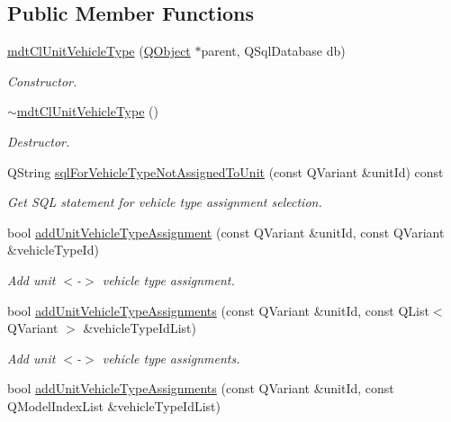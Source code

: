 \subsection*{Public Member Functions}
\begin{DoxyCompactItemize}
\item 
\hyperlink{classmdt_cl_unit_vehicle_type_a887c0df770b0943494c7852f593c795f}{mdt\-Cl\-Unit\-Vehicle\-Type} (\hyperlink{class_q_object}{Q\-Object} $\ast$parent, Q\-Sql\-Database db)
\begin{DoxyCompactList}\small\item\em Constructor. \end{DoxyCompactList}\item 
\hyperlink{classmdt_cl_unit_vehicle_type_a80006aaf243aa3b74d8a5f0fcefbb1fa}{$\sim$mdt\-Cl\-Unit\-Vehicle\-Type} ()
\begin{DoxyCompactList}\small\item\em Destructor. \end{DoxyCompactList}\item 
Q\-String \hyperlink{classmdt_cl_unit_vehicle_type_a94e443219c2136b359b9c3202c489bc9}{sql\-For\-Vehicle\-Type\-Not\-Assigned\-To\-Unit} (const Q\-Variant \&unit\-Id) const 
\begin{DoxyCompactList}\small\item\em Get S\-Q\-L statement for vehicle type assignment selection. \end{DoxyCompactList}\item 
bool \hyperlink{classmdt_cl_unit_vehicle_type_a92a758c6c2fe0d1c0357a1f4b506f50c}{add\-Unit\-Vehicle\-Type\-Assignment} (const Q\-Variant \&unit\-Id, const Q\-Variant \&vehicle\-Type\-Id)
\begin{DoxyCompactList}\small\item\em Add unit $<$-\/$>$ vehicle type assignment. \end{DoxyCompactList}\item 
bool \hyperlink{classmdt_cl_unit_vehicle_type_ab8dfb71baa475692016d867aa687c212}{add\-Unit\-Vehicle\-Type\-Assignments} (const Q\-Variant \&unit\-Id, const Q\-List$<$ Q\-Variant $>$ \&vehicle\-Type\-Id\-List)
\begin{DoxyCompactList}\small\item\em Add unit $<$-\/$>$ vehicle type assignments. \end{DoxyCompactList}\item 
bool \hyperlink{classmdt_cl_unit_vehicle_type_a10380461e506c35417f2367ed94ab9d2}{add\-Unit\-Vehicle\-Type\-Assignments} (const Q\-Variant \&unit\-Id, const Q\-Model\-Index\-List \&vehicle\-Type\-Id\-List)

\end{DoxyCompactItemize}
